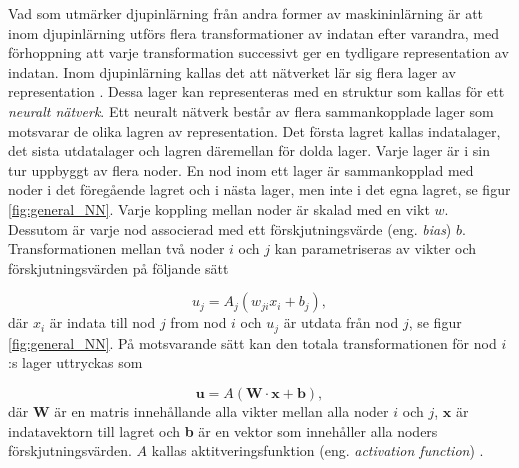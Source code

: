 Vad som utmärker djupinlärning från andra former av maskininlärning är att inom djupinlärning utförs flera transformationer av indatan efter varandra, med förhoppning att varje transformation successivt ger en tydligare representation av indatan. Inom djupinlärning kallas det att nätverket lär sig flera lager av representation \cite{Chollet}. Dessa lager kan representeras med en struktur som kallas för ett \textit{neuralt nätverk}. Ett neuralt nätverk består av flera sammankopplade lager som motsvarar de olika lagren av representation. Det första lagret kallas indatalager, det sista utdatalager och lagren däremellan för dolda lager. Varje lager är i sin tur uppbyggt av flera noder. En nod inom ett lager är sammankopplad med noder i det föregående lagret och i nästa lager, men inte i det egna lagret, se figur \ref{fig:general_NN}. Varje koppling mellan noder är skalad med en vikt $w$. Dessutom är varje nod associerad med ett förskjutningsvärde (eng. \emph{bias}) $b$. Transformationen mellan två noder $i$ och $j$ kan parametriseras av vikter och förskjutningsvärden på följande sätt 

\begin{equation}
    u_j = A_j \left(w_{ji}x_i + b_j\right),
    \label{eq:node_transform}
\end{equation}
där $x_i$ är indata till nod $j$ from nod $i$ och $u_j$ är utdata från nod $j$, se figur \ref{fig:general_NN}. På motsvarande sätt kan den totala transformationen för nod $i$:s lager uttryckas som 

\begin{equation}
    \textbf{u} = A(\textbf{W} \cdot \textbf{x} + \textbf{b}),
    \label{eq:network_transform}
\end{equation}
\noindent där $\textbf{W}$ är en matris innehållande alla vikter mellan alla noder $i$ och $j$, $\textbf{x}$ är indatavektorn till lagret och \textbf{b} är en vektor som innehåller alla noders förskjutningsvärden. $A$ kallas aktitveringsfunktion (eng. \emph{activation function}) \cite{Chollet}. 



